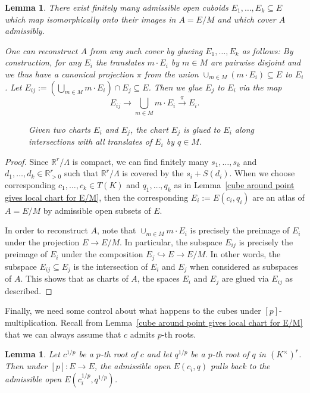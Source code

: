 \documentclass[10pt,oneside]{amsart}
\newtheorem{lemma}[theorem]{Lemma}
\theoremstyle{definition}
\theoremstyle{remark}
\begin{document}
	\begin{lemma}\label{an admissible cover of A by cuboids of E}
	There exist finitely many admissible open cuboids $E_1,\dots,E_k\subseteq E$ which map isomorphically onto their images in $A=E/M$ and which cover $A$ admissibly. 
	
	One can reconstruct $A$ from any such cover by glueing $E_1,\dots,E_k$ as follows: By construction, for any $E_i$ the translates $m\cdot E_i$ by $m\in M$ are pairwise disjoint and we thus have a canonical projection $\pi$ from the union $\cup_{m\in M} (m\cdot E_i)\subseteq E$ to $E_i$.	Let $E_{ij}:=(\bigcup_{m\in M} m\cdot E_i)\cap E_j \subseteq E$. Then we glue $E_j$ to $E_i$ via the map
	\[E_{ij}\rightarrow \bigcup_{m\in M} m\cdot E_i \xrightarrow{\pi} E_i.\]
	
	\begin{figure}
		\caption{Given two charts $E_i$ and $E_j$, the chart $E_j$ is glued to $E_i$ along intersections with all translates of $E_i$ by $q\in M$.}
		\label{glue-cover-tikzpicture}
	\end{figure}
	
	\end{lemma} 
	\begin{proof}
	Since $\mathbb R^r/\Lambda$ is compact, we can find finitely many $s_1,\dots,s_k$ and $d_1,\dots,d_k \in \mathbb{R}^r_{>0}$ such that $\mathbb R^r/\Lambda$ is covered by the $s_i+S(d_i)$. When we choose corresponding $c_1,\dots,c_k \in T(K)$ and $q_1,\dots,q_k$ as in Lemma~\ref{cube around point gives local chart for E/M}, then the corresponding $E_i:=E(c_i,q_i)$ are an atlas of $A=E/M$ by admissible open subsets of $E$.
	
	In order to reconstruct $A$, note that $\cup_{m\in M} m\cdot E_i$ is precisely the preimage of $E_i$ under the projection $E\rightarrow E/M$. In particular, the subspace $E_{ij}$ is precisely the preimage of $E_i$ under the composition $E_j\hookrightarrow E \rightarrow E/M$. In other words, the subspace $E_{ij}\subseteq E_j$ is the intersection of $E_i$ and $E_j$ when considered as subspaces of $A$. This shows that as charts of $A$, the spaces $E_i$ and $E_j$ are glued via $E_{ij}$ as described.
	\end{proof}
	Finally, we need some control about what happens to the cubes under $[p]$-multiplication. Recall from Lemma~\ref{cube around point gives local chart for E/M} that we can always assume that $c$ admits $p$-th roots.
	\begin{lemma}\label{pullback of cuboid is cuboid}
		Let $c^{1/p}$ be a $p$-th root of $c$ and let $q^{1/p}$ be a $p$-th root of $q$ in $(K^\times)^r$. Then under $[p]:E\rightarrow E$, the admissible open $E(c_i,q)$ pulls back to the admissible open $E(c_i^{1/p},q^{1/p})$.
	\end{lemma}
\end{document}
